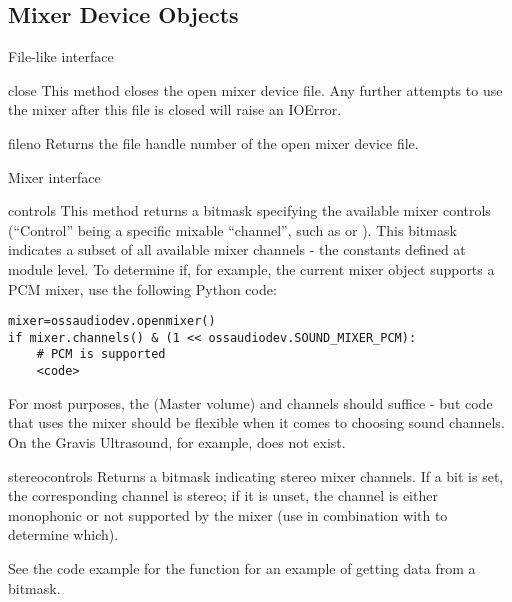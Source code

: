 \subsection{Mixer Device Objects \label{mixer-device-objects}}

File-like interface

\begin{methoddesc}{close}{}
This method closes the open mixer device file. Any further attempts to use the
mixer after this file is closed will raise an IOError.
\end{methoddesc}

\begin{methoddesc}{fileno}{}
Returns the file handle number of the open mixer device file.
\end{methoddesc}

Mixer interface

\begin{methoddesc}{controls}{}
This method returns a bitmask specifying the available mixer controls
(``Control'' being a specific mixable ``channel'', such as
 or ). This
bitmask indicates a subset of all available mixer channels - the
 constants defined at module level. To determine if,
for example, the current mixer object supports a PCM mixer, use the
following Python code:

\begin{verbatim}
mixer=ossaudiodev.openmixer()
if mixer.channels() & (1 << ossaudiodev.SOUND_MIXER_PCM):
	# PCM is supported
	<code>
\end{verbatim}

For most purposes, the  (Master volume) and
 channels should suffice - but code that uses the mixer
should be flexible when it comes to choosing sound channels. On the Gravis
Ultrasound, for example,  does not exist.
\end{methoddesc}

\begin{methoddesc}{stereocontrols}{}
Returns a bitmask indicating stereo mixer channels. If a bit is set, the
corresponding channel is stereo; if it is unset, the channel is either
monophonic or not supported by the mixer (use in combination with
 to determine which).

See the code example for the  function for an example of
getting data from a bitmask.
\end{methoddesc}

